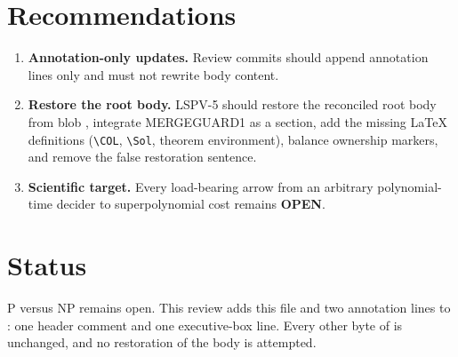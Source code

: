 \documentclass[11pt]{article}
\newcommand{\OPEN}{\textbf{OPEN}}
\begin{document}
\section{Recommendations}
\begin{enumerate}
\item \textbf{Annotation-only updates.} Review commits should append
annotation lines only and must not rewrite body content.
\item \textbf{Restore the root body.} LSPV-5 should restore the reconciled
root body from blob , integrate MERGEGUARD1 as a section,
add the missing LaTeX definitions (\verb|\COL|, \verb|\Sol|, theorem
environment), balance ownership markers, and remove the false restoration
sentence.
\item \textbf{Scientific target.} Every load-bearing arrow from an
arbitrary polynomial-time decider to superpolynomial cost remains
\OPEN{}.
\end{enumerate}

\section{Status}
P versus NP remains open. This review adds this file and two annotation
lines to : one header comment and one executive-box line.
Every other byte of  is unchanged, and no restoration of
the body is attempted.

\end{document}
